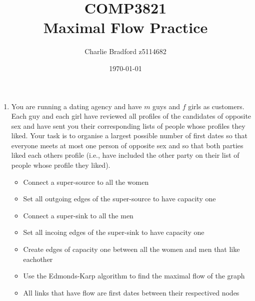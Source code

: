 \documentclass[a4paper]{article}
\title{%
		COMP3821 \\
\large Maximal Flow Practice}
\author{Charlie Bradford z5114682}
\date{\today}
\begin{document}
\vspace{-2cm}
\maketitle

\begin{enumerate}
		
		\item You are running a dating agency and have $m$ guys and $f$ girls as customers. Each guy and each girl have reviewed all profiles of the candidates of opposite sex and have sent you their corresponding lists of people whose profiles they liked. Your task is to organise a largest possible number of first dates so that everyone meets at most one person of opposite sex and so that both parties liked each others profile (i.e., have included the other party on their list of people whose profile they liked).
				\begin{itemize}
						\item Connect a super-source to all the women
						\item Set all outgoing edges of the super-source to have capacity one
						\item Connect a super-sink to all the men
						\item Set all incoing edges of the super-sink to have capacity one
						\item Create edges of capacity one between all the women and men that like eachother
						\item Use the Edmonds-Karp algorithm to find the maximal flow of the graph
						\item All links that have flow are first dates between their respectived nodes
				\end{itemize}


\end{enumerate}
\end{document}
